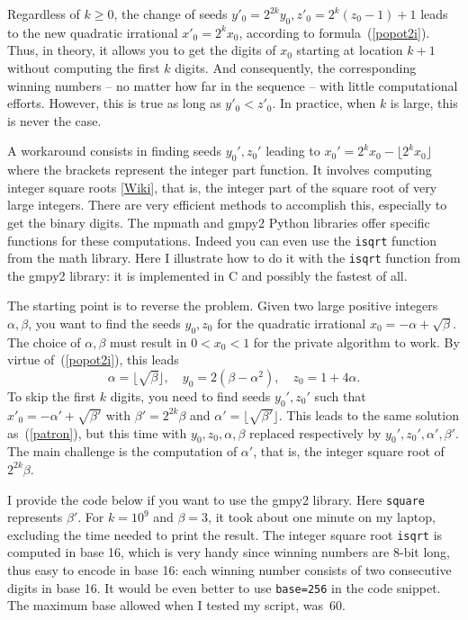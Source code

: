 \documentclass[oneside,10pt]{book}
\begin{document}
Regardless of $k\geq 0$, the change of seeds $y'_0 =  2^{2k}y_0, z'_0 = 2^k(z_0-1)+1$ leads to the new quadratic irrational $x'_0 = 2^k x_0$, according to formula~(\ref{popot2i}). Thus, in theory, it allows you to  get the digits of $x_0$ starting at location $k+1$ without  computing the first $k$ digits. And consequently, the corresponding winning numbers -- no matter how far in the sequence -- with little computational efforts. However, this is true as long as $y'_0 < z'_0$. 
In practice, when $k$ is large, this is never the case. 

A workaround consists in finding seeds $y_0', z_0'$ leading to $x_0' = 2^kx_0 - \lfloor 2^k x_0\rfloor$ where
 the brackets represent the integer part function. It involves computing 
\textcolor{index}{integer square roots} [\href{https://en.wikipedia.org/wiki/Integer_square_root}{Wiki}], that is, the integer part of the square root of very large integers. There are very efficient methods to accomplish this,
 especially to get the binary digits. The \textcolor{index}{mpmath} and 
\textcolor{index}{gmpy2} Python libraries offer specific functions for these
 computations. Indeed you can even use the \texttt{isqrt} function from the math library. Here I illustrate how to
 do it with the \texttt{isqrt} function from the gmpy2 library: it is implemented in C and possibly the fastest of all. 

The starting point is to reverse the problem. Given two large positive integers $\alpha,\beta$, you want to find the seeds 
 $y_0, z_0$ for the quadratic irrational 
$x_0 = -\alpha + \sqrt{\beta}$. 
The choice of $\alpha,\beta$ must result in $0<x_0<1$ for the private algorithm to work.
By virtue of~(\ref{popot2i}), this leads
\begin{equation}
\alpha = \lfloor \sqrt{\beta} \rfloor, \quad y_0 = 2(\beta - \alpha^2),\quad z_0 = 1 + 4\alpha. \label{patron}
\end{equation}
To skip the first $k$ digits, you need to find seeds $y_0',z_0'$ such that $x'_0 = -\alpha' +\sqrt{\beta'}$ with 
 $\beta'= 2^{2k}\beta$ and $\alpha'=\lfloor \sqrt{\beta'} \rfloor$. This leads to the same solution
 as~(\ref{patron}), but this time with $y_0,z_0,\alpha,\beta$ replaced respectively by
$y_0',z_0',\alpha',\beta'$. The main challenge is the computation of $\alpha'$, that is, the integer square root of $2^{2k}\beta$.

I provide the code below if you want to use the gmpy2 library. Here \texttt{square} represents $\beta'$. For $k=10^9$ and $\beta=3$, it took about one minute on my laptop, excluding the time needed to print the result. The integer square root \texttt{isqrt} is computed in base 16, which is very handy since winning numbers are 8-bit long, thus easy to encode in base 16: each winning number consists of two consecutive digits in base 16.  It would be even better to use \texttt{base=256} in the code snippet. The maximum base allowed
 when I tested my script, was~60.
\end{document}
